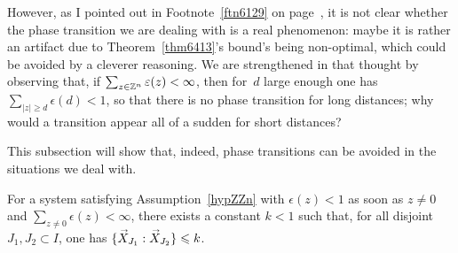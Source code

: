 However, as I pointed out in Footnote~\ref{ftn6129} on page~\pageref{ftn6129},
it is not clear whether the phase transition we are dealing with is a real phenomenon:
maybe it is rather an artifact due to Theorem~\ref{thm6413}'s bound's being non-optimal,
which could be avoided by a cleverer reasoning.
We are strengthened in that thought by observing that,
if $\sum_{z\in\mathbb{Z}^n} \varepsilon(z) < \infty$,
then for~$d$ large enough one has
$\sum_{|z|\geq d} \epsilon(d) < 1$,
so that there is no phase transition for long distances;
why would a transition appear all of a sudden for short distances?

This subsection will show that, indeed, phase transitions can be avoided
in the situations we deal with.

\begin{Lem}\label{lem4067}
For a system satisfying Assumption~\ref{hypZZn}
with $\epsilon(z)<1$ as soon as $z\neq0$ and $\sum_{z\neq0} \epsilon (z) < \infty$,
there exists a constant $k<1$ such that, for all disjoint
$J_1,J_2\subset I$, one has ${\{\vec{X}_{J_1}:\vec{X}_{J_2}\}} \ab \leq k$.
\end{Lem}

